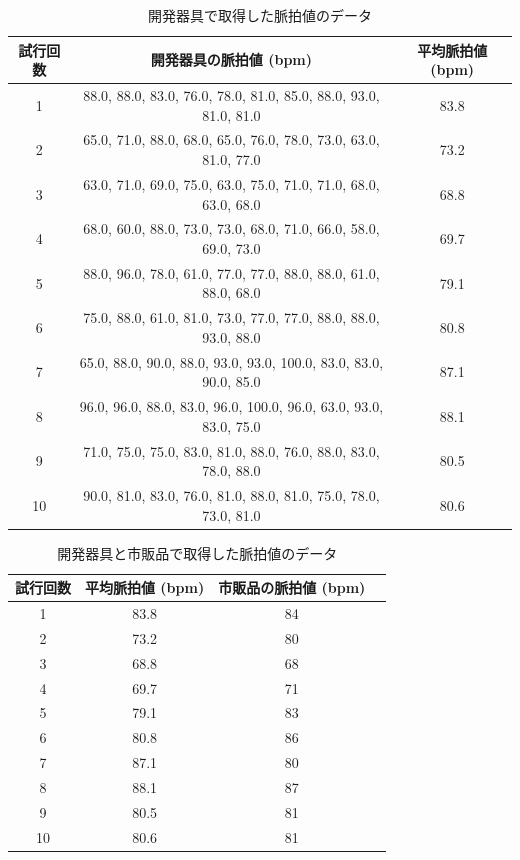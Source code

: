 \begin{table}[H]
    \centering
    \caption{開発器具で取得した脈拍値のデータ}
    \label{d1_data}
    \begin{tabular}{|c|c|c|}
        \hline
        試行回数&開発器具の脈拍値 (bpm)& 平均脈拍値 (bpm)\\\hline
        1&88.0, 88.0, 83.0, 76.0, 78.0, 81.0, 85.0, 88.0, 93.0, 81.0, 81.0&83.8\\ \hline
        2&65.0, 71.0, 88.0, 68.0, 65.0, 76.0, 78.0, 73.0, 63.0, 81.0, 77.0&73.2\\ \hline
        3&63.0, 71.0, 69.0, 75.0, 63.0, 75.0, 71.0, 71.0, 68.0, 63.0, 68.0&68.8 \\ \hline
        4&68.0, 60.0, 88.0, 73.0, 73.0, 68.0, 71.0, 66.0, 58.0, 69.0, 73.0&69.7 \\ \hline
        5&88.0, 96.0, 78.0, 61.0, 77.0, 77.0, 88.0, 88.0, 61.0, 88.0, 68.0&79.1 \\ \hline
        6&75.0, 88.0, 61.0, 81.0, 73.0, 77.0, 77.0, 88.0, 88.0, 93.0, 88.0&80.8 \\ \hline
        7&65.0, 88.0, 90.0, 88.0, 93.0, 93.0, 100.0, 83.0, 83.0, 90.0, 85.0&87.1 \\ \hline
        8&96.0, 96.0, 88.0, 83.0, 96.0, 100.0, 96.0, 63.0, 93.0, 83.0, 75.0&88.1 \\ \hline
        9&71.0, 75.0, 75.0, 83.0, 81.0, 88.0, 76.0, 88.0, 83.0, 78.0, 88.0&80.5 \\ \hline
        10&90.0, 81.0, 83.0, 76.0, 81.0, 88.0, 81.0, 75.0, 78.0, 73.0, 81.0&80.6 \\ \hline
    \end{tabular}
\end{table}

\begin{table}[H]
    \centering
    \caption{開発器具と市販品で取得した脈拍値のデータ}
    \label{d1_data_average}
    \begin{tabular}{|c|c|c|c|}
        \hline
        試行回数& 平均脈拍値 (bpm) & 市販品の脈拍値 (bpm) \\\hline
        1&83.8&84 \\ \hline
        2&73.2&80 \\ \hline
        3&68.8&68 \\ \hline
        4&69.7&71 \\ \hline
        5&79.1&83 \\ \hline
        6&80.8&86 \\ \hline
        7&87.1&80 \\ \hline
        8&88.1&87 \\ \hline
        9&80.5&81 \\ \hline
        10&80.6&81 \\ \hline
    \end{tabular}
\end{table}

